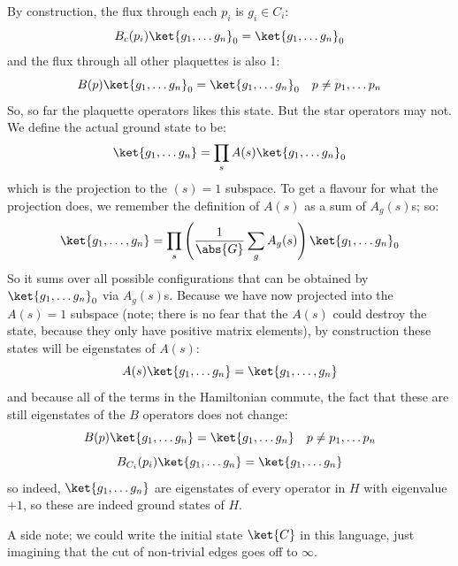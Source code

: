 By construction, the flux through each $p_i$ is $g_i \in C_i$:
\begin{equation}
    B_c(p_i)\ket{g_1, \ldots g_n}_0 = \ket{g_1, \ldots g_n}_0
\end{equation}
and the flux through all other plaquettes is also 1:
\begin{equation}
    B(p)\ket{g_1, \ldots g_n}_0 = \ket{g_1, \ldots g_n}_0 \quad p \neq p_1, \ldots p_n
\end{equation}
So, so far the plaquette operators likes this state. But the star operators may not. We define the actual ground state to be:
\begin{equation}
    \ket{g_1, \ldots g_n} = \prod_s A(s)\ket{g_1, \ldots g_n}_0
\end{equation}
which is the projection to the $(s) = 1$ subspace. To get a flavour for what the projection does, we remember the definition of $A(s)$ as a sum of $A_g(s)$s; so:
\begin{equation}
    \ket{g_1, \ldots, g_n} = \prod_s\left(\frac{1}{\abs{G}}\sum_g A_g(s)\right)\ket{g_1, \ldots g_n}_0
\end{equation}
So it sums over all possible configurations that can be obtained by $\ket{g_1, \ldots g_n}_0$ via $A_g(s)$s. Because we have now projected into the $A(s) = 1$ subspace (note; there is no fear that the $A(s)$ could destroy the state, because they only have positive matrix elements), by construction these states will be eigenstates of $A(s)$:
\begin{equation}
    A(s)\ket{g_1, \ldots g_n} = \ket{g_1, \ldots, g_n}
\end{equation}
and because all of the terms in the Hamiltonian commute, the fact that these are still eigenstates of the $B$ operators does not change:
\begin{equation}
    B(p)\ket{g_1, \ldots g_n} = \ket{g_1, \ldots g_n} \quad p \neq p_1, \ldots p_n
\end{equation}
\begin{equation}
    B_{C_i}(p_i)\ket{g_1, \ldots g_n} = \ket{g_1, \ldots g_n}
\end{equation}
so indeed, $\ket{g_1, \ldots g_n}$ are eigenstates of every operator in $H$ with eigenvalue $+1$, so these are indeed ground states of $H$.

A side note; we could write the initial state $\ket{C}$ in this language, just imagining that the cut of non-trivial edges goes off to $\infty$.

